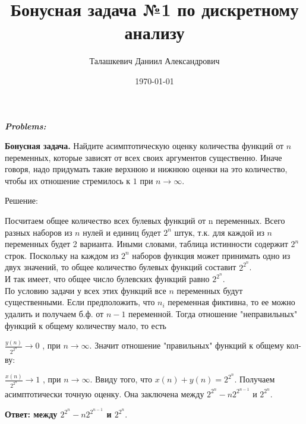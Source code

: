 \documentclass[a4paper,12pt]{article} %
\author{Талашкевич Даниил Александрович}
\title{Бонусная задача №1 по дискретному анализу}
\date{\today}
\begin{document}
\maketitle
\thispagestyle{empty}

\newpage
\setcounter{page}{1}
\begin{center}
\itshape
\bfseries
{ \Large Problems:}
\end{center}

{\bf Бонусная задача.}  Найдите асимптотическую оценку количества функций от $n$ переменных, которые зависят от всех своих аргументов существенно. Иначе говоря, надо придумать такие верхнюю и нижнюю оценки на это количество, чтобы их отношение стремилось к $1$ при $n\rightarrow \infty$.


\begin{center}
{\Large Решение: }
\end{center}
Посчитаем общее количество всех булевых функций от n переменных. Всего разных наборов из $n$ нулей и единиц будет $2^n$ штук, т.к. для каждой из $n$ переменных будет 2 варианта. Иными словами, таблица истинности содержит $2^n$ строк. Поскольку на каждом из $2^n$ наборов функция может принимать одно из двух значений, то общее количество булевых функций составит $2^{2^n}$.\\
И так имеет, что общее число булевских функций равно $2^{2^n}$.\\
По условию задачи у всех этих функций все $n$ переменных будут существенными. Если предположить, что $n_i$ переменная фиктивна, то ее можно удалить и получаем б.ф. от $n-1$ переменной. Тогда отношение "неправильных" функций к общему количеству мало, то есть

$\frac{y(n)}{2^{2^n}} \rightarrow 0$ , при $n \rightarrow \infty$. Значит отношение "правильных" функций к общему кол-ву:

$\frac{x(n)}{2^{2^n}} \rightarrow 1$ , при $n \rightarrow \infty$.
Ввиду того, что $x(n) + y(n) = 2^{2^n}$. Получаем асимптотически точную оценку. Она заключена между $  2^{2^n}-n2^{2^{n-1}}$ и $2^{2^n}.$
\begin{flushright}
\begin{large}
\textbf {Ответ: между $  2^{2^n}-n2^{2^{n-1}}$ и $2^{2^n}.$ }
\end{large}
\end{flushright}
\end{document}
